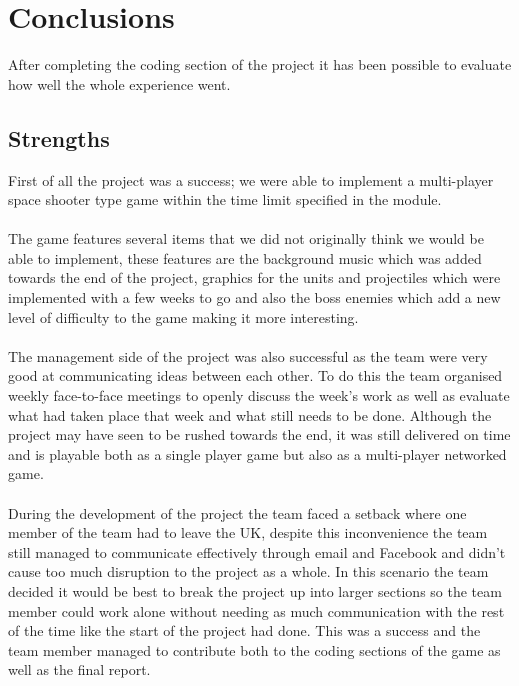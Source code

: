 
\chapter{Conclusions}
\label{cha:conclusions}

After completing the coding section of the project it has been possible to evaluate how well the whole experience went.


\section{Strengths}
\label{sec: strengths}
First of all the project was a success; we were able to implement a multi-player space shooter type game within the time limit specified in the module.\\\\
The game features several items that we did not originally think we would be able to implement, these features are the background music which was added towards the end of the project, graphics for the units and projectiles which were implemented with a few weeks to go and also the boss enemies which add a new level of difficulty to the game making it more interesting.\\\\
The management side of the project was also successful as the team were very good at communicating ideas between each other. To do this the team organised weekly face-to-face meetings to openly discuss the week's work as well as evaluate what had taken place that week and what still needs to be done. Although the project may have seen to be rushed towards the end, it was still delivered on time and is playable both as a single player game but also as a multi-player networked game.\\\\
During the development of the project the team faced a setback where one member of the team had to leave the UK, despite this inconvenience the team still managed to communicate effectively through email and Facebook and didn't cause too much disruption to the project as a whole. In this scenario the team decided it would be best to break the project up into larger sections so the team member could work alone without needing as much communication with the rest of the time like the start of the project had done. This was a success and the team member managed to contribute both to the coding sections of the game as well as the final report.
